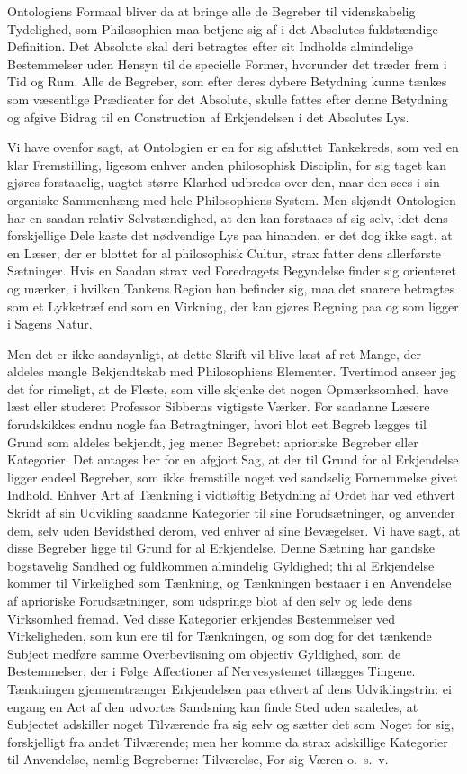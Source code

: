 \documentclass[12pt]{article}
\newcommand{\opage}[1]{\marginnote{\footnotesize\textit{[#1]}}}
\begin{document}
Ontologiens Formaal bliver da at bringe alle de Begreber til videnskabelig
Tydelighed, som Philosophien maa betjene sig af i det Absolutes fuldstændige
Definition. Det Absolute skal deri betragtes efter sit Indholds almindelige
Bestemmelser uden Hensyn til de specielle Former, hvorunder det træder frem i
Tid og Rum. Alle de Begreber, som efter deres dybere Betydning kunne tænkes som
væsentlige Prædicater for det Absolute, skulle fattes efter denne Betydning og
afgive Bidrag til en Construction af Erkjendelsen i det Absolutes Lys.

Vi have ovenfor sagt, at Ontologien er en for sig afsluttet Tankekreds, som ved
en klar Fremstilling, ligesom enhver anden philosophisk Disciplin, for sig taget
kan gjøres forstaaelig, uagtet større Klarhed udbredes over den, naar den sees i
sin organiske Sammenhæng med hele Philosophiens System. Men skjøndt Ontologien
har en saadan relativ Selvstændighed, at den kan forstaaes af sig selv, idet
dens forskjellige Dele kaste det nødvendige Lys paa hinanden, er det dog ikke
sagt, at en Læser, der er blottet for al philosophisk Cultur, strax fatter dens
allerførste Sætninger. Hvis en Saadan strax ved Foredragets Begyndelse finder
sig orienteret og mærker, i hvilken Tankens Region han befinder sig, maa det
snarere betragtes som et Lykketræf end som en Virkning, der kan gjøres Regning
paa og som ligger i Sagens Natur.

Men det er ikke sandsynligt, at dette Skrift vil blive læst af ret Mange, der
aldeles mangle Bekjendtskab med Philosophiens Elementer. Tvertimod anseer jeg
det for rimeligt, at de Fleste, som ville skjenke det nogen Opmærksomhed, have
læst eller stu\opage{196}deret Professor Sibberns vigtigste Værker. For
saadanne Læsere forudskikkes endnu nogle faa Betragtninger, hvori blot eet
Begreb lægges til Grund som aldeles bekjendt, jeg mener Begrebet: aprioriske
Begreber eller Kategorier. Det antages her for en afgjort Sag, at der til Grund
for al Erkjendelse ligger endeel Begreber, som ikke fremstille noget ved
sandselig Fornemmelse givet Indhold. Enhver Art af Tænkning i vidtløftig
Betydning af Ordet har ved ethvert Skridt af sin Udvikling saadanne Kategorier
til sine Forudsætninger, og anvender dem, selv uden Bevidsthed derom, ved enhver
af sine Bevægelser. Vi have sagt, at disse Begreber ligge til Grund for al
Erkjendelse. Denne Sætning har gandske bogstavelig Sandhed og fuldkommen
almindelig Gyldighed; thi al Erkjendelse kommer til Virkelighed som Tænkning, og
Tænkningen bestaaer i en Anvendelse af aprioriske Forudsætninger, som udspringe
blot af den selv og lede dens Virksomhed fremad. Ved disse Kategorier erkjendes
Bestemmelser ved Virkeligheden, som kun ere til for Tænkningen, og som dog for
det tænkende Subject medføre samme Overbeviisning om objectiv Gyldighed, som de
Bestemmelser, der i Følge Affectioner af Nervesystemet tillægges Tingene.
Tænkningen gjennemtrænger Erkjendelsen paa ethvert af dens Udviklingstrin: ei
engang en Act af den udvortes Sandsning kan finde Sted uden saaledes, at
Subjectet adskiller noget Tilværende fra sig selv og sætter det som Noget for
sig, forskjelligt fra andet Tilværende; men her komme da strax adskillige
Kategorier til Anvendelse, nemlig Begreberne: Tilværelse, For-sig-Væren o.\ s.\ v.
\end{document}
